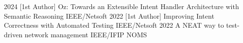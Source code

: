\documentclass[9pt]{developercv} %
\begin{document}

\vspace{-1em}

\begin{entrylist}
	\pubentry
	{2024}
	{[1st Author]}
	{Oz: Towards an Extensible Intent Handler Architecture with Semantic
	Reasoning}
	{IEEE/Netsoft}
	\pubentry
	{2022}
	{[1st Author]}
	{Improving Intent Correctness with Automated Testing}
	{IEEE/Netsoft}
	\pubentry
	{2022}
	{}
	{A NEAT way to test-driven network management}
	{IEEE/IFIP NOMS}
\end{entrylist}

\end{document}

